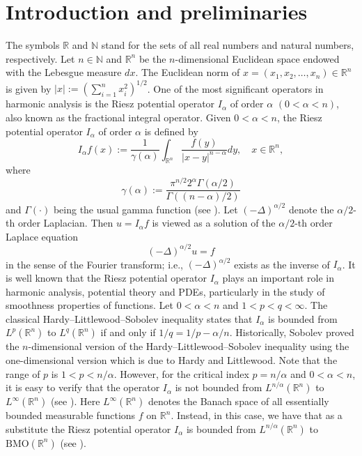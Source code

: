 \documentclass[preprint,10pt]{elsarticle}
\numberwithin{equation}{section}
\begin{document}
\section{Introduction and preliminaries}
\label{sec1}
The symbols $\mathbb R$ and $\mathbb N$ stand for the sets of all real numbers and natural numbers, respectively. Let $n\in\mathbb N$ and $\mathbb R^n$ be the $n$-dimensional Euclidean space endowed with the Lebesgue measure $dx$. The Euclidean norm of $x=(x_1,x_2,\dots,x_n)\in \mathbb R^n$ is given by $|x|:=(\sum_{i=1}^n x_i^2)^{1/2}$.
One of the most significant operators in harmonic analysis is the Riesz potential operator $I_{\alpha}$ of order $\alpha$ $(0<\alpha<n)$, also known as the fractional integral operator. Given $0<\alpha<n$, the Riesz potential operator $I_{\alpha}$ of order $\alpha$ is defined by
\begin{equation*}
I_{\alpha}f(x):=\frac{1}{\gamma(\alpha)}\int_{\mathbb R^n}\frac{f(y)}{|x-y|^{n-\alpha}}dy, \quad x\in\mathbb R^n,
\end{equation*}
where
\begin{equation*}
\gamma(\alpha):=\frac{\pi^{n/2}2^{\alpha}\Gamma(\alpha/2)}{\Gamma({(n-\alpha)}/2)}
\end{equation*}
and $\Gamma(\cdot)$ being the usual gamma function (see \cite{grafakos}). Let $(-\Delta)^{\alpha/2}$ denote the $\alpha/2$-th order Laplacian. Then $u=I_{\alpha}f$ is viewed as a solution of the $\alpha/2$-th order Laplace equation
\begin{equation*}
(-\Delta)^{\alpha/2}u=f
\end{equation*}
in the sense of the Fourier transform; i.e., $(-\Delta)^{\alpha/2}$ exists as the inverse of $I_{\alpha}$. It is well known that the Riesz potential operator $I_{\alpha}$ plays an important role in harmonic analysis, potential theory and PDEs, particularly in the study of smoothness properties of functions. Let $0<\alpha<n$ and $1<p<q<\infty$. The classical Hardy--Littlewood--Sobolev inequality states that $I_{\alpha}$ is bounded from $L^p(\mathbb R^n)$ to $L^q(\mathbb R^n)$ if and only if $1/q=1/p-\alpha/n$. Historically, Sobolev proved the $n$-dimensional version of the Hardy--Littlewood--Sobolev inequality using the one-dimensional version which is due to Hardy and Littlewood. Note that the range of $p$ is $1<p<n/{\alpha}$. However, for the critical index $p=n/{\alpha}$ and $0<\alpha<n$, it is easy to verify that the operator $I_{\alpha}$ is not bounded from $L^{n/{\alpha}}(\mathbb R^n)$ to $L^{\infty}(\mathbb R^n)$ (see \cite[p.119]{stein}). Here $L^{\infty}(\mathbb R^n)$ denotes the Banach space of all essentially bounded measurable functions $f$ on $\mathbb R^n$. Instead, in this case, we have that as a substitute the Riesz potential operator $I_{\alpha}$ is bounded from $L^{n/{\alpha}}(\mathbb R^n)$ to $\mathrm{BMO}(\mathbb R^n)$ (see \cite[p.130]{duoand}).
\end{document}
